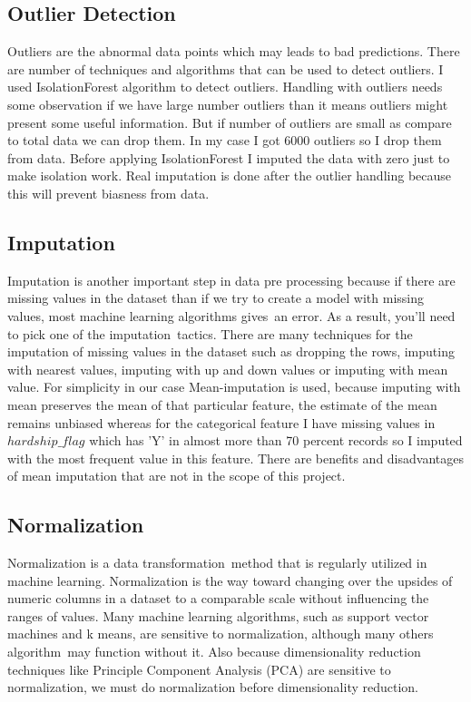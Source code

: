 \documentclass[12pt]{article}
\begin{document}
\subsection{Outlier Detection}
Outliers are the abnormal data points which may leads to bad predictions. There are number of techniques and algorithms that can be used to detect outliers. I used IsolationForest algorithm to detect outliers. Handling with outliers needs some observation if we have large number outliers than it means outliers might present some useful information. But if number of outliers are small as compare to total data we can drop them. In my case I got 6000 outliers so I drop them from data. Before applying IsolationForest I imputed the data with zero just to make isolation work. Real imputation is done after the outlier handling because this will prevent biasness from data.

\subsection{Imputation}
Imputation is another important step in data pre processing because if there are missing values in the dataset than if we try to create a model with missing values, most machine learning algorithms gives an error. As a result, you'll need to pick one of the imputation tactics. There are many techniques for the imputation of missing values in the dataset such as dropping the rows, imputing with nearest values, imputing with up and down values or imputing with mean value. For simplicity in our case Mean-imputation is used, because imputing with mean preserves the mean of that particular feature, the estimate of the mean remains unbiased whereas for the categorical feature I have missing values in $hardship\_flag$ which has 'Y' in almost more than 70 percent records so I imputed with the most frequent value in this feature. There are benefits and disadvantages of mean imputation that are not in the scope of this project.

\subsection{Normalization}
Normalization is a data transformation method that is regularly utilized in machine learning. Normalization is the way toward changing over the upsides of numeric columns in a dataset to a comparable scale without influencing the ranges of values. Many machine learning algorithms, such as support vector machines and k means, are sensitive to normalization, although many others algorithm may function without it. Also because dimensionality reduction techniques like Principle Component Analysis (PCA) are sensitive to normalization, we must do normalization before dimensionality reduction.
\end{document}
